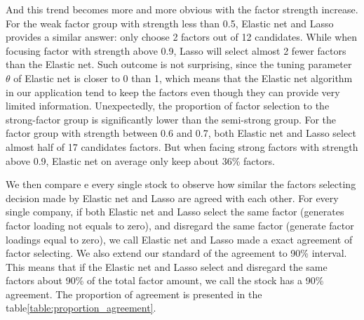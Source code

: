 And this trend becomes more and more obvious with the factor strength increase.
For the weak factor group with strength less than 0.5, Elastic net and Lasso provides a similar answer: only choose 2 factors out of 12 candidates.
While when focusing factor with strength above 0.9, Lasso will select almost 2 fewer factors than the Elastic net.
Such outcome is not surprising, since the tuning parameter $\theta$ of Elastic net is closer to 0 than 1, which means that the Elastic net algorithm in our application tend to keep the factors even though they can provide very limited information.
Unexpectedly, the proportion of factor selection to the strong-factor group is significantly lower than the semi-strong group.
For the factor group with strength between 0.6 and 0.7, both Elastic net and Lasso select almost half of 17 candidates factors. 
But when facing strong factors with strength above 0.9, Elastic net on average only keep about 36\% factors.

We then compare e every single stock to observe how similar the factors selecting decision made by Elastic net and Lasso are agreed with each other.
For every single company, if both Elastic net and Lasso select the same factor (generates factor loading not equals to zero), and disregard the same factor (generate factor loadings equal to zero), we call Elastic net and Lasso made a exact agreement of factor selecting.
We also extend our standard of the agreement to 90\% interval. 
This means that if the Elastic net and Lasso select and disregard the same factors about 90\% of the total factor amount, we call the stock has a 90\% agreement.
The proportion of agreement is presented in the table\ref{table:proportion_agreement}.

